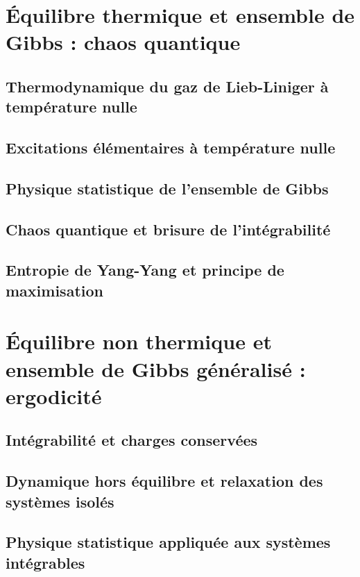 \chapter{Équilibre thermique et ensemble de Gibbs : chaos quantique}
\minitoc
\section{Thermodynamique du gaz de Lieb-Liniger à température nulle}
\section{Excitations élémentaires à température nulle}

\section{Physique statistique de l’ensemble de Gibbs}



\section{Chaos quantique et brisure de l’intégrabilité}
\section{Entropie de Yang-Yang et principe de maximisation}

\chapter{Équilibre non thermique et ensemble de Gibbs généralisé : ergodicité}
\minitoc
\section{Intégrabilité et charges conservées}
\section{Dynamique hors équilibre et relaxation des systèmes isolés}
\section{Physique statistique appliquée aux systèmes intégrables}

